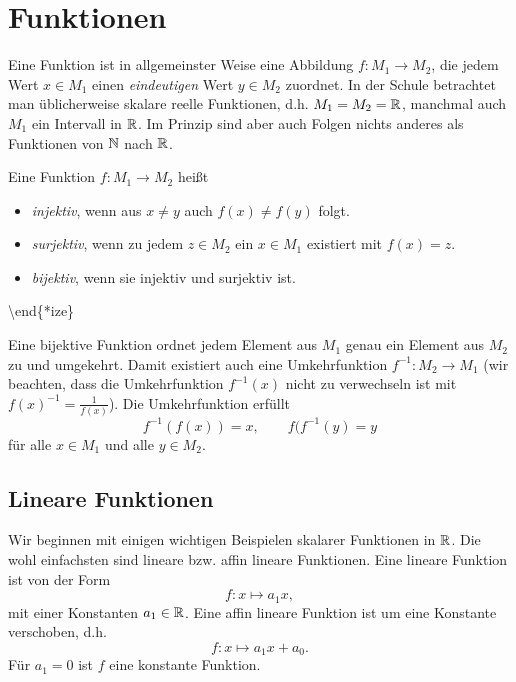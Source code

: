 \section{Funktionen}
\label{\detokenize{vorkurs/funktionen:funktionen}}\label{\detokenize{vorkurs/funktionen::doc}}
Eine Funktion ist in allgemeinster Weise eine Abbildung \(f: M_1 \rightarrow M_2\), die jedem Wert \(x \in M_1\) einen \emph{eindeutigen} Wert \(y \in M_2\) zuordnet. In der Schule betrachtet man üblicherweise skalare reelle Funktionen, d.h. \(M_1=M_2=\mathbb{R}\), manchmal auch \(M_1\) ein Intervall in \(\mathbb{R}\). Im Prinzip sind aber auch Folgen nichts anderes als Funktionen von \(\mathbb{N}\) nach \(\mathbb{R}\).
\label{vorkurs/funktionen:definition-0}
\begin{definition}{}{}



Eine Funktion \(f:M_1 \rightarrow M_2\) heißt
\begin{itemize}
\item {} 
\emph{injektiv}, wenn aus \(x \neq y\) auch \(f(x) \neq f(y)\) folgt.

\item {} 
\emph{surjektiv}, wenn zu jedem \(z \in M_2\) ein \(x \in M_1\) existiert mit \(f(x)=z\).

\item {} 
\emph{bijektiv}, wenn sie injektiv und surjektiv ist.

\end{itemize}

\textbackslash{}end\{*ize\}
\end{definition}

Eine bijektive Funktion ordnet jedem Element aus \(M_1\) genau ein Element aus \(M_2\) zu und umgekehrt. Damit existiert  auch eine Umkehrfunktion \(f^{-1}: M_2 \rightarrow M_1\) (wir beachten, dass die Umkehrfunktion \(f^{-1}(x)\) nicht zu verwechseln ist mit \(f(x)^{-1} = \frac{1}{f(x)}\)). Die Umkehrfunktion erfüllt
\begin{equation*}
 f^{-1}(f(x)) = x, \qquad f(f^{-1}(y) = y\end{equation*}
für alle \(x \in M_1\) und alle \(y \in M_2\).


\subsection{Lineare Funktionen}
\label{\detokenize{vorkurs/funktionen:lineare-funktionen}}
Wir beginnen mit einigen wichtigen Beispielen skalarer Funktionen in \(\mathbb{R}\). Die wohl einfachsten sind lineare bzw. affin lineare Funktionen. Eine lineare Funktion ist von der Form
\begin{equation*}
 f:x \mapsto a_1 x,\end{equation*}
mit einer Konstanten \(a_1 \in \mathbb{R}\). Eine affin lineare Funktion ist um eine Konstante verschoben, d.h.
\begin{equation*}
 f:x\mapsto a_1 x + a_0.\end{equation*}
Für \(a_1 =0\) ist \(f\) eine konstante Funktion.

